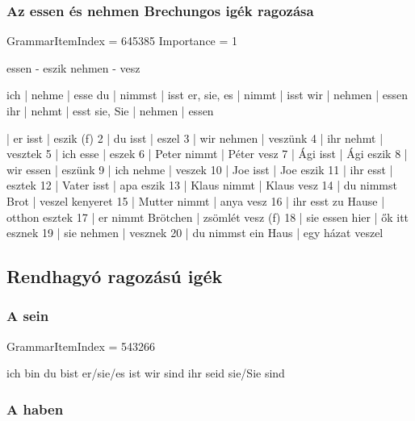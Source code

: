 \documentclass{article}
\newenvironment{desc}{\verbatim}{\endverbatim}
\newenvironment{exmp}{\verbatim}{\endverbatim}
\begin{document}
\begin{exmp}
\end{exmp}

\subsubsection{Az essen és nehmen Brechungos igék ragozása}

GrammarItemIndex = 645385
Importance = 1

\begin{desc}
essen - eszik
nehmen - vesz

ich         | nehme  | esse 
du          | nimmst | isst 
er, sie, es | nimmt  | isst 
wir         | nehmen | essen 
ihr         | nehmt  | esst 
sie, Sie    | nehmen | essen 
\end{desc}

\begin{exmp}
1 | er isst | eszik (f)
2 | du isst | eszel
3 | wir nehmen | veszünk
4 | ihr nehmt | vesztek
5 | ich esse | eszek
6 | Peter nimmt | Péter vesz
7 | Ági isst | Ági eszik
8 | wir essen | eszünk
9 | ich nehme | veszek
10 | Joe isst | Joe eszik
11 | ihr esst | esztek
12 | Vater isst | apa eszik
13 | Klaus nimmt | Klaus vesz
14 | du nimmst Brot | veszel kenyeret
15 | Mutter nimmt | anya vesz
16 | ihr esst zu Hause | otthon esztek
17 | er nimmt Brötchen | zsömlét vesz (f)
18 | sie essen hier | ők itt esznek
19 | sie nehmen | vesznek
20 | du nimmst ein Haus | egy házat veszel
\end{exmp}

\subsection{Rendhagyó ragozású igék}

\subsubsection{A sein}

GrammarItemIndex = 543266

\begin{desc}
ich bin 
du bist 
er/sie/es ist 
wir sind 
ihr seid 
sie/Sie sind 
\end{desc}

\begin{exmp}
\end{exmp}

\subsubsection{A haben}
\end{document}
